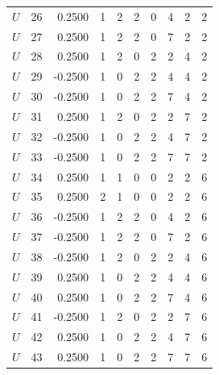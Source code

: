 \begin{tabular}{crrrrrrrrr}
    $U $ & 26  &  0.2500 & 1 & 2 & 2 & 0 & 4 & 2 & 2 \\
    $U $ & 27  &  0.2500 & 1 & 2 & 2 & 0 & 7 & 2 & 2 \\
    $U $ & 28  &  0.2500 & 1 & 2 & 0 & 2 & 2 & 4 & 2 \\
    $U $ & 29  & -0.2500 & 1 & 0 & 2 & 2 & 4 & 4 & 2 \\
    $U $ & 30  & -0.2500 & 1 & 0 & 2 & 2 & 7 & 4 & 2 \\
    $U $ & 31  &  0.2500 & 1 & 2 & 0 & 2 & 2 & 7 & 2 \\
    $U $ & 32  & -0.2500 & 1 & 0 & 2 & 2 & 4 & 7 & 2 \\
    $U $ & 33  & -0.2500 & 1 & 0 & 2 & 2 & 7 & 7 & 2 \\
    $U $ & 34  &  0.2500 & 1 & 1 & 0 & 0 & 2 & 2 & 6 \\
    $U $ & 35  &  0.2500 & 2 & 1 & 0 & 0 & 2 & 2 & 6 \\
    $U $ & 36  & -0.2500 & 1 & 2 & 2 & 0 & 4 & 2 & 6 \\
    $U $ & 37  & -0.2500 & 1 & 2 & 2 & 0 & 7 & 2 & 6 \\
    $U $ & 38  & -0.2500 & 1 & 2 & 0 & 2 & 2 & 4 & 6 \\
    $U $ & 39  &  0.2500 & 1 & 0 & 2 & 2 & 4 & 4 & 6 \\
    $U $ & 40  &  0.2500 & 1 & 0 & 2 & 2 & 7 & 4 & 6 \\
    $U $ & 41  & -0.2500 & 1 & 2 & 0 & 2 & 2 & 7 & 6 \\
    $U $ & 42  &  0.2500 & 1 & 0 & 2 & 2 & 4 & 7 & 6 \\
    $U $ & 43  &  0.2500 & 1 & 0 & 2 & 2 & 7 & 7 & 6
\hline
\hline
    \end{tabular}

